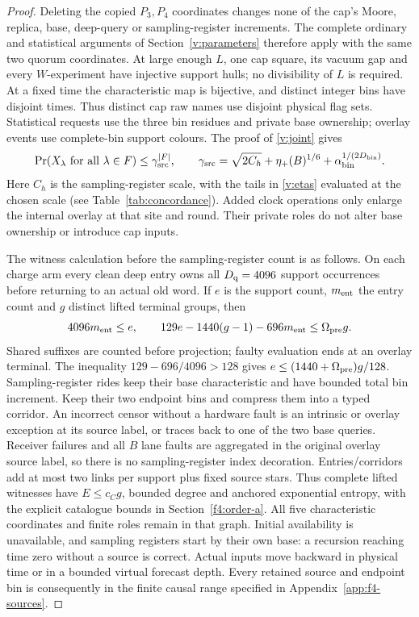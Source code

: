 \begin{proof}
Deleting the copied \(P_3,P_4\) coordinates changes none of the cap's
Moore, replica, base, deep-query or sampling-register increments. The complete
ordinary and statistical arguments of Section~\ref{v:parameters}
therefore apply with the same two quorum coordinates. At large enough
\(L\), one cap square, its vacuum gap and every \(W\)-experiment
have injective support hulls; no divisibility of \(L\) is required.
At a fixed time the characteristic map is bijective, and distinct
integer bins have disjoint times. Thus distinct cap raw names use
disjoint physical flag sets. Statistical requests use the three bin
residues and private base ownership; overlay events use complete-bin
support colours. The proof of \eqref{v:joint} gives
\[
 \Pr(X_\lambda\text{ for all }\lambda\in F)\le\gamma_{\rm src}^{|F|},\qquad
 \gamma_{\rm src}=\sqrt{2C_h}+\eta_+(B)^{1/6}
                      +\alpha_{\rm bin}^{1/(2D_{\rm bin})}.
\]
Here \(C_h\) is the sampling-register scale, with the tails in \eqref{v:etas} evaluated at the chosen scale (see Table~\ref{tab:concordance}). Added clock operations only
enlarge the internal overlay at that site and round. Their private
roles do not alter base ownership or introduce cap inputs.

The witness calculation before the sampling-register count is as
follows. On each charge arm every clean deep entry owns all
\(D_{\rm q}=4096\) support occurrences before returning to an actual
old word. If \(e\) is the support count, \(m_{\rm ent}\) the entry count and \(g\)
distinct lifted terminal groups, then
\[
 4096m_{\rm ent}\le e,\qquad129e-1440(g-1)-696m_{\rm ent}\le\Omega_{\rm pre}g.
\]
Shared suffixes are counted before projection; faulty evaluation ends
at an overlay terminal. The inequality \(129-696/4096>128\) gives
\(e\le(1440+\Omega_{\rm pre})g/128\). Sampling-register rides keep their base
characteristic and have bounded total bin increment. Keep their two
endpoint bins and compress them into a typed corridor. An incorrect censor without a hardware fault is an intrinsic or overlay exception at its source label, or traces back to one of the two base queries. Receiver failures and all
\(B\) lane faults are aggregated in the original overlay source label, so
there is no sampling-register index decoration. Entries/corridors add at most two
links per support plus fixed source stars. Thus complete lifted
witnesses have \(E\le c_Cg\), bounded degree and anchored exponential
entropy, with the explicit catalogue bounds in Section~\ref{f4:order-a}.
All five characteristic coordinates and finite roles remain in that
graph. Initial availability is unavailable, and sampling registers start by their
own base: a recursion reaching time zero without a source is correct.
Actual inputs move backward in physical time or in a bounded virtual
forecast depth. Every retained source and endpoint bin is consequently
in the finite causal range specified in Appendix~\ref{app:f4-sources}.


\end{proof}
